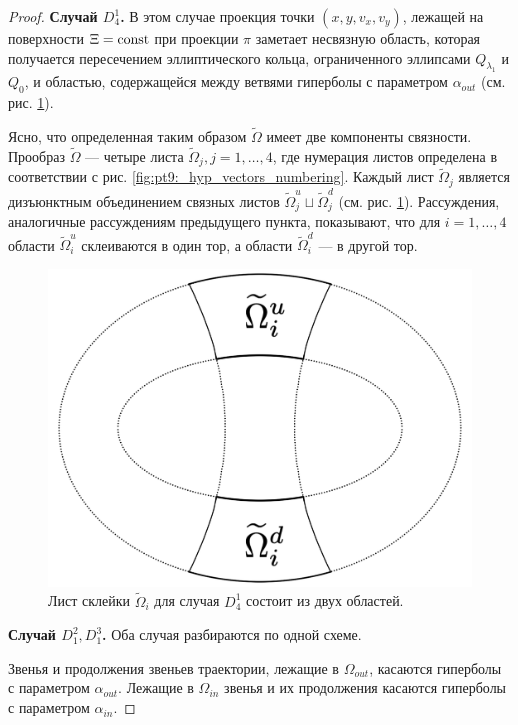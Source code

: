 \begin{proof}
\medskip
\textbf{Случай $D_4^1$.} В этом случае проекция точки $(x, y, v_x, v_y)$, лежащей на поверхности $\Xi=\mathrm{const}$ при проекции $\pi$ заметает несвязную область, которая получается пересечением эллиптического кольца, ограниченного эллипсами $Q_{\lambda_1}$ и $Q_{0}$, и областью, содержащейся между ветвями гиперболы с параметром $\alpha_{out}$  (см. рис. \ref{fig:pt9:_d41_page}). 

Ясно, что определенная таким образом $\widetilde{\Omega}$ имеет две компоненты связности. Прообраз $\widetilde{\Omega}$ --- четыре листа $\widetilde{\Omega}_j, j=1, \ldots, 4$, где нумерация листов определена в соответствии с рис. \ref{fig:pt9:_hyp_vectors_numbering}. Каждый лист $\widetilde{\Omega}_j$ является  дизъюнктным объединением связных  листов $\widetilde{\Omega}_j^u \sqcup \widetilde{\Omega}_j^d$ (см. рис. \ref{fig:pt9:_d41_page}). 
Рассуждения, аналогичные рассуждениям предыдущего пункта, показывают, что для $i=1,\ldots, 4$ области $\widetilde{\Omega}_i^u$ склеиваются в один тор, а области $\widetilde{\Omega}_i^d$ --- в другой тор.


\begin{figure}[!htb]
\centering
\includegraphics[width=0.35\linewidth]{images/section2/d41_page.pdf}
    \caption{Лист склейки  $\widetilde{\Omega}_i$  для случая $D_4^1$ состоит из двух областей.}
    \label{fig:pt9:_d41_page}
\end{figure}

\medskip
\textbf{Случай $D_1^2, D_1^3$. } 
Оба случая разбираются по одной схеме. 

Звенья и продолжения звеньев траектории, лежащие в $\Omega_{out}$, касаются гиперболы с параметром $\alpha_{out}$. Лежащие в $\Omega_{in}$ звенья и их продолжения касаются гиперболы с параметром $\alpha_{in}$.


\end{proof}
